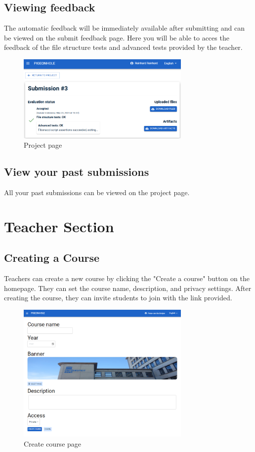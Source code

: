 \documentclass{article}
\begin{document}
\subsection{Viewing feedback}
The automatic feedback will be immediately available after submitting and can be viewed on the submit feedback page. Here you will be able to acces the feedback of the file structure tests and advanced tests provided by the teacher.

\begin{figure}[H]
    \centering
    \includegraphics[width=0.75\textwidth]{images/submissionfeedback.png}
    \caption{Project page}
\end{figure}

\subsection{View your past submissions}
All your past submissions can be viewed on the project page.

\section{Teacher Section}

\subsection{Creating a Course}
Teachers can create a new course by clicking the "Create a course" button on the homepage. They can set the course name, description, and privacy settings. After creating the course, they can invite students to join with the link provided.

\begin{figure}[H]
    \centering
    \includegraphics[width=0.75\textwidth]{images/createcourse.png}
    \caption{Create course page}
\end{figure}
\end{document}

